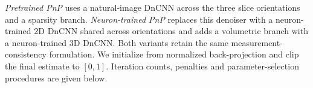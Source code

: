 \emph{Pretrained PnP} uses a natural-image DnCNN \cite{zhang2017} across the three slice orientations and a sparsity branch. \emph{Neuron-trained PnP} replaces this denoiser with a neuron-trained 2D DnCNN shared across orientations and adds a volumetric branch with a neuron-trained 3D DnCNN. Both variants retain the same measurement-consistency formulation. We initialize from normalized back-projection and clip the final estimate to $[0,1]$. Iteration counts, penalties and parameter-selection procedures are given below.
